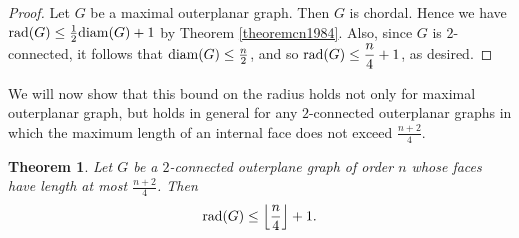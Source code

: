 \documentclass[a4paper,11pt]{article}
\newtheorem{theorem}{Theorem}[section]
\numberwithin{equation}{theorem}
\begin{document}
\begin{proof}
Let $G$ be a maximal outerplanar graph. Then $G$ is chordal. Hence we have 
${\rm rad}(G) \leq \frac{1}{2}{\rm diam}(G) +1$ by Theorem \ref{theoremcn1984}. 
Also, since $G$ is $2$-connected, it follows that ${\rm diam}(G)\leq \frac{n}{2}$, 
and so  ${\rm rad}(G) \leq \dfrac{n}{4}+1$, as desired. 
\end{proof}

We will now show that this bound on the radius holds not only for maximal outerplanar graph, but holds in general for any $2$-connected outerplanar graphs in which the maximum length of an internal face does not exceed $\frac{n+2}{4}$.

\begin{theorem}\label{theo:rad in Outerpanar}
Let $G$ be a $2$-connected outerplane graph of order $n$ whose faces have length at most 
$\frac{n+2}{4}$. 
Then
\[ {\rm rad}(G) \leq \left\lfloor \frac{n}{4} \right\rfloor + 1. \]
\end{theorem}
\end{document}
